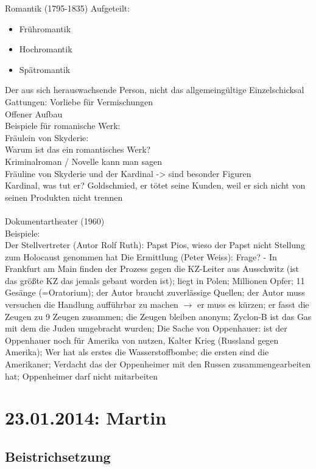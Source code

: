 \documentclass[a4paper]{article}
\begin{document}
Romantik (1795-1835)
Aufgeteilt:
\begin{itemize}
\item Frühromantik
\item Hochromantik
\item Spätromantik
\end{itemize}

Der aus sich herauswachsende Person, nicht das allgemeingültige Einzelschicksal\\
Gattungen: Vorliebe für Vermischungen\\
Offener Aufbau\\
Beispiele für romanische Werk:\\
Fräulein von Skyderie:\\
Warum ist das ein romantisches Werk?\\
Kriminalroman / Novelle kann man sagen\\
Fräuline von Skyderie und der Kardinal -> sind besonder Figuren\\
Kardinal, was tut er? Goldschmied, er tötet seine Kunden, weil er sich nicht von seinen Produkten nicht trennen\\\\
Dokumentartheater (1960)\\
Beispiele:\\
Der Stellvertreter (Autor Rolf Ruth): Papst Pios, wieso der Papst nicht Stellung zum Holocaust genommen hat
Die Ermittlung (Peter Weiss): Frage? - In Frankfurt am Main finden der Prozess gegen die KZ-Leiter aus Ausschwitz (ist das größte KZ das jemals gebaut worden ist); liegt in Polen; Millionen Opfer; 11 Gesänge (=Oratorium); der Autor braucht zuverlässige Quellen; der Autor muss versuchen die Handlung aufführbar zu machen $\rightarrow$ er muss es kürzen; er fasst die Zeugen zu 9 Zeugen zusammen; die Zeugen bleiben anonym; Zyclon-B ist das Gas mit dem die Juden umgebracht wurden; 
Die Sache von Oppenhauer: ist der Oppenhauer noch für Amerika von nutzen, Kalter Krieg (Russland gegen Amerika); Wer hat als erstes die Wasserstoffbombe; die ersten sind die Amerikaner; Verdacht das der Oppenheimer mit den Russen zusammengearbeiten hat; Oppenheimer darf nicht mitarbeiten 

\section{23.01.2014: Martin}

\subsection{Beistrichsetzung}
\end{document}
